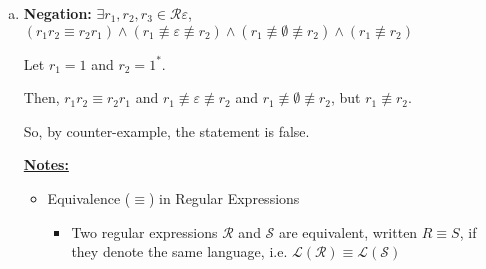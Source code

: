 \documentclass[12pt]{article}
\begin{document}
\begin{enumerate}[a.]
    \item

    \textbf{Negation:} $\exists r_1,r_2,r_3 \in \mathcal{R}\varepsilon$, $(r_1r_2
    \equiv r_2r_1)\land (r_1 \not\equiv \varepsilon \not\equiv r_2)
    \land (r_1 \not\equiv \emptyset \not\equiv r_2) \land (r_1 \not\equiv r_2)$

    \bigskip

    Let $r_1 = 1$ and $r_2 = 1^*$.

    \bigskip

    Then, $r_1r_2 \equiv r_2r_1$ and $r_1 \not\equiv \varepsilon \not\equiv r_2$ and
    $r_1 \not\equiv \emptyset \not\equiv r_2$, but $r_1 \not\equiv r_2$.

    \bigskip

    So, by counter-example, the statement is false.











    \bigskip

    \underline{\textbf{Notes:}}

    \bigskip

    \begin{itemize}
        \item Equivalence ($\equiv$) in Regular Expressions
        \begin{itemize}
            \item Two regular expressions $\mathcal{R}$ and $\mathcal{S}$ are
            equivalent, written $R \equiv S$, if they denote the same language,
            i.e. $\mathcal{L}(\mathcal{R}) \equiv \mathcal{L}(\mathcal{S})$


\end{itemize}
\end{itemize}
\end{enumerate}
\end{document}
